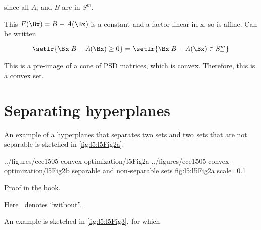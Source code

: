since all \( A_i \) and \( B \) are in \( S^m \).

This \( F(\Bx) = B - A(\Bx) \) is a constant and a factor linear in x, so is affine.  Can be written

\begin{equation}\label{eqn:convexOptimizationLecture5:260}
\setlr{ \Bx | B - A(\Bx) \ge 0 }
=
\setlr{ \Bx | B - A(\Bx) \in S^m_{+} }
\end{equation}

This is a pre-image of a cone of PSD matrices, which is convex.  Therefore, this is a convex set.

\section{Separating hyperplanes}


An example of a hyperplanes that separates two sets and two sets that are not separable is sketched in
\cref{fig:l5:l5Fig2a}.

\imageTwoFigures
{../figures/ece1505-convex-optimization/l5Fig2a}
{../figures/ece1505-convex-optimization/l5Fig2b}
{separable and non-separable sets}
{fig:l5:l5Fig2a}
{scale=0.1}

Proof in the book.


Here \( \ \) denotes ``without''.

An example is sketched in \cref{fig:l5:l5Fig3}, for which

